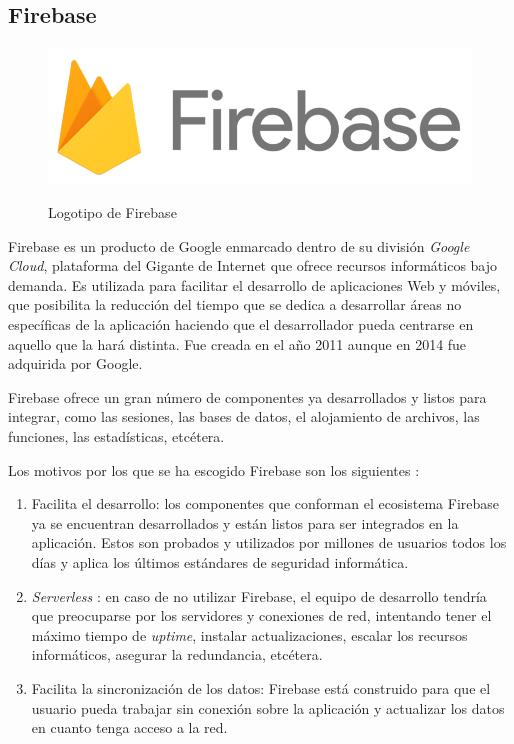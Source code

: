 \documentclass[twoside]{report}
\begin{document}
\subsection{Firebase}

\begin{figure}[H]
\centering
\includegraphics[scale=0.3]{images/firebase}\\
\caption{Logotipo de Firebase} \cite{firebase}
\end{figure}


Firebase es un producto de Google enmarcado dentro de su división \textit{Google Cloud}, plataforma del Gigante de Internet que ofrece recursos informáticos bajo demanda. Es utilizada para facilitar el desarrollo de aplicaciones Web y móviles, que posibilita la reducción del tiempo que se dedica a desarrollar áreas no específicas de la aplicación haciendo que el desarrollador pueda centrarse en aquello que la hará distinta. Fue creada en el año 2011 aunque en 2014 fue adquirida por Google.

Firebase ofrece un gran número de componentes ya desarrollados y listos para integrar, como las sesiones, las bases de datos, el alojamiento de archivos, las funciones, las estadísticas, etcétera.

Los motivos por los que se ha escogido Firebase son los siguientes \cite{firebaseadvdis}:

\begin{enumerate}

\item Facilita el desarrollo: los componentes que conforman el ecosistema Firebase ya se encuentran desarrollados y están listos para ser integrados en la aplicación. Estos son probados y utilizados por millones de usuarios todos los días y aplica los últimos estándares de seguridad informática.

\item \textit{Serverless} : en caso de no utilizar Firebase, el equipo de desarrollo tendría que preocuparse por los servidores y conexiones de red, intentando tener el máximo tiempo de \textit{uptime}, instalar actualizaciones, escalar  los recursos informáticos, asegurar la redundancia, etcétera.

\item Facilita la sincronización de los datos: Firebase está construido para que el usuario pueda trabajar sin conexión sobre la aplicación y actualizar los datos en cuanto tenga acceso a la red.
\end{enumerate}
\end{document}
